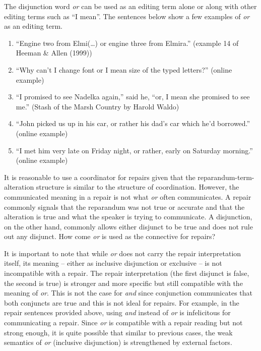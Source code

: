 \documentclass[oneside]{report}
\theoremstyle{definition}
\theoremstyle{definition}
\theoremstyle{definition}
\theoremstyle{remark}
\begin{document}
The disjunction word \emph{or} can be used as an editing term alone or
along with other editing terms such as ``I mean''. The sentences below
show a few examples of \emph{or} as an editing term.
\begin{enumerate}
\def\labelenumi{(\arabic{enumi})}
\setcounter{enumi}{9}
\tightlist
\item
  ``Engine two from Elmi(\ldots{}) or engine three from Elmira.''
  (example 14 of Heeman \& Allen (1999))
\item
  ``Why can't I change font or I mean size of the typed letters?''
  (online example)
\item
  ``I promised to see Nadelka again,'' said he, ``or, I mean she
  promised to see me.'' (Stash of the Marsh Country by Harold Waldo)
\item
  ``John picked us up in his car, or rather his dad's car which he'd
  borrowed.'' (online example)
\item
  ``I met him very late on Friday night, or rather, early on Saturday
  morning.'' (online example)
\end{enumerate}
It is reasonable to use a coordinator for repairs given that the
reparandum-term-alteration structure is similar to the structure of
coordination. However, the communicated meaning in a repair is not what
\emph{or} often communicates. A repair commonly signals that the
reparandum was not true or accurate and that the alteration is true and
what the speaker is trying to communicate. A disjunction, on the other
hand, commonly allows either disjunct to be true and does not rule out
any disjunct. How come \emph{or} is used as the connective for repairs?

It is important to note that while \emph{or} does not carry the repair
interpretation itself, its meaning -- either as inclusive disjunction or
exclusive -- is not incompatible with a repair. The repair
interpretation (the first disjunct is false, the second is true) is
stronger and more specific but still compatible with the meaning of
\emph{or}. This is not the case for \emph{and} since conjunction
communicates that both conjuncts are true and this is not ideal for
repairs. For example, in the repair sentences provided above, using
\emph{and} instead of \emph{or} is infelicitous for communicating a
repair. Since \emph{or} is compatible with a repair reading but not
strong enough, it is quite possible that similar to previous cases, the
weak semantics of \emph{or} (inclusive disjunction) is strengthened by
external factors.
\end{document}

